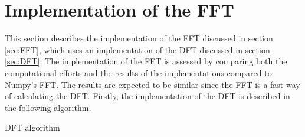 \section{Implementation of the FFT}
This section describes the implementation of the FFT discussed in section \ref{sec:FFT}, which uses an implementation of the DFT discussed in section \ref{sec:DFT}. The implementation of the FFT is assessed by comparing both the computational efforts and the results of the implementations compared to Numpy's FFT. The results are expected to be similar since the FFT is a fast way of calculating the DFT. Firstly, the implementation of the DFT is described in the following algorithm.

\begin{algorithm}
\caption{DFT algorithm}
\label{DFTalg}
\begin{algorithmic}[1]
		 
		\EndFor
	\EndFor
\EndProcedure
\end{algorithmic}
\end{algorithm}

